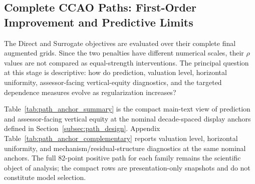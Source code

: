 \documentclass[10pt]{article}
\theoremstyle{definition}
\newcommand{\1}{\mathbf{1}}
\begin{document}
\subsection{Complete CCAO Paths: First-Order Improvement and Predictive Limits}
\label{subsec:path_results}


The Direct and Surrogate objectives are evaluated over their complete final augmented grids. Since the two penalties have different numerical scales, their
$\rho$ values are not compared as equal-strength interventions. The principal
question at this stage is descriptive: how do prediction, valuation level,
horizontal uniformity, assessor-facing vertical-equity diagnostics, and the targeted
dependence measures evolve as regularization increases?


Table~\ref{tab:path_anchor_summary} is the compact main-text view of prediction and assessor-facing vertical equity at the nominal decade-spaced display anchors defined in Section~\ref{subsec:path_design}. Appendix Table~\ref{tab:path_anchor_complementary} reports valuation level, horizontal uniformity, and mechanism/residual-structure diagnostics at the same nominal anchors. The full 82-point positive path for each family remains the scientific object of analysis; the compact rows are presentation-only snapshots and do not constitute model selection.
\end{document}
